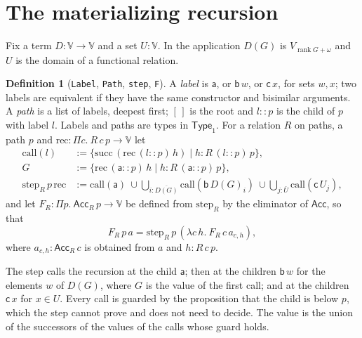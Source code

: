 \documentclass[10pt]{article}
\theoremstyle{definition}
\newtheorem{definition}[theorem]{Definition}
\theoremstyle{remark}
\newcommand{\Type}{\mathsf{Type}}
\newcommand{\rk}{\operatorname{rank}}
\newcommand{\Acc}{\mathsf{Acc}}
\newcommand{\V}{\mathbb{V}}
\newcommand{\la}{\mathsf{a}}
\newcommand{\lb}{\mathsf{b}}
\newcommand{\lc}{\mathsf{c}}
\newcommand{\lean}[1]{\texttt{#1}}
\newcommand{\guard}[2]{\{#1\mid #2\}}
\begin{document}
\section{The materializing recursion}\label{sec:mat}

Fix a term $D:\V\to\V$ and a set $U:\V$. In the application $D(G)$
is $V_{\rk G+\omega}$ and $U$ is the domain of a functional relation.

\begin{definition}[\lean{Label}, \lean{Path}, \lean{step}, \lean{F}]\label{def:mat}
A \emph{label} is $\la$, or $\lb\,w$, or $\lc\,x$, for sets $w,x$; two
labels are equivalent if they have the same constructor and
bisimilar arguments. A \emph{path} is a list of labels, deepest first;
$[\,]$ is the root and $l::p$ is the child of $p$ with label $l$. Labels
and paths are types in $\Type_1$. For a relation $R$ on paths, a path $p$
and $\mathrm{rec}:\Pi c.\ R\,c\,p\to\V$ let
\begin{align*}
\mathrm{call}(l)&:=\guard{\mathrm{succ}\,(\mathrm{rec}\,(l::p)\,h)}{h:R\,(l::p)\,p},\\
G&:=\guard{\mathrm{rec}\,(\la::p)\,h}{h:R\,(\la::p)\,p},\\
\mathrm{step}_R\,p\,\mathrm{rec}&:=\mathrm{call}(\la)\ \cup
  \textstyle\bigcup_{i:\overline{D(G)}}\mathrm{call}(\lb\,D(G)_i)\ \cup
  \bigcup_{j:\bar U}\mathrm{call}(\lc\,U_j),
\end{align*}
and let $F_R:\Pi p.\ \Acc_R\,p\to\V$ be defined from $\mathrm{step}_R$ by the
eliminator of $\Acc$, so that
\[F_R\,p\,a=\mathrm{step}_R\,p\,(\lambda c\,h.\ F_R\,c\,a_{c,h}),\]
where $a_{c,h}:\Acc_R\,c$ is obtained from $a$ and $h:R\,c\,p$.
\end{definition}

The step calls the recursion at the child $\la$; then at the children
$\lb\,w$ for the elements $w$ of $D(G)$, where $G$ is the value of the
first call; and at the children $\lc\,x$ for $x\in U$. Every call is
guarded by the proposition that the child is below $p$, which the step
cannot prove and does not need to decide. The value is the union of the
successors of the values of the calls whose guard holds.
\end{document}
